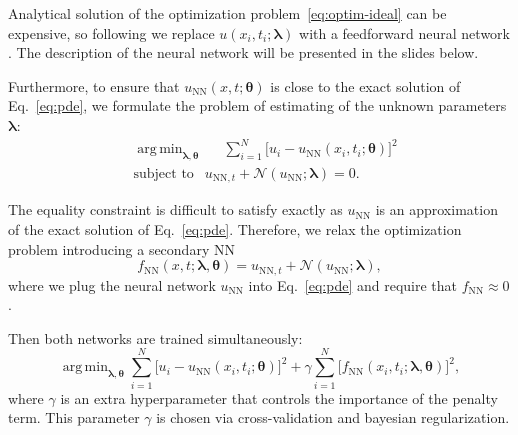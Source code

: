 \documentclass{beamer}
\renewcommand{\vec}[1]{\boldsymbol{#1}}
\newcommand{\VTheta}{\ensuremath{\vec{\theta}}}
\newcommand{\VLambda}{\ensuremath{\vec{\lambda}}}
\DeclareMathOperator*{\argmin}{arg\,min}
\newcommand{\UNN}[1][\text{NN}]{u_{#1}}
\newcommand{\FNN}[1][\text{NN}]{f_{#1}}
\newcommand{\NonlinOp}{\mathcal N\!}
\begin{document}
\begin{frame}

Analytical solution of the optimization problem~\eqref{eq:optim-ideal} can be expensive, so following \cite{raissi2017pinnII}
we replace  $u(x_i, t_i; \VLambda)$ with a 
feedforward neural network \cite{goodfellow2016deep}. The description of the neural network will be presented in the slides below.

Furthermore, to ensure that $\UNN( x, t; \VTheta)$
is close to the exact solution of Eq.~\eqref{eq:pde}, we formulate the problem of estimating of the unknown parameters
$\VLambda$:
\begin{subequations}
\label{eq:optim}
\begin{align}
    &\argmin_{\VLambda, \VTheta} \quad \ \ 
        \sum_{i=1}^N \big[u_i - \UNN(x_i, t_i; \VTheta)\big]^2  \\
    &\text{subject to } \ \ \UNN[\text{NN}, t]  + \NonlinOp(\UNN; \VLambda) = 0.
\end{align}
\end{subequations}

\end{frame}

\begin{frame}
The equality constraint is difficult to satisfy exactly as
$u_{\text{NN}}$ is an approximation of the exact solution of
Eq.~\eqref{eq:pde}.
Therefore, we relax the optimization problem introducing a secondary NN
\begin{equation}
    \FNN(x, t; \VLambda, \VTheta) =
        u_{\text{NN}, t} + \NonlinOp(u_{\text{NN}}; \VLambda),
\end{equation}
where we plug the neural network $\UNN$ into Eq.~\eqref{eq:pde} and
require that $\FNN \approx 0$.

Then both networks are trained simultaneously:
\begin{equation}
    \argmin_{\VLambda, \VTheta}
    \sum_{i=1}^N \big[ u_i - \UNN(x_i, t_i; \VTheta)\big ]^2
    +\gamma \sum_{i=1}^N \big[ \FNN(x_i, t_i; \VLambda, \VTheta) \big]^2,
\end{equation}
where $\gamma$ is an extra hyperparameter that controls the importance of the
penalty term.
This parameter $\gamma$ is chosen via cross-validation and bayesian regularization.
    
\end{frame}
\end{document}
